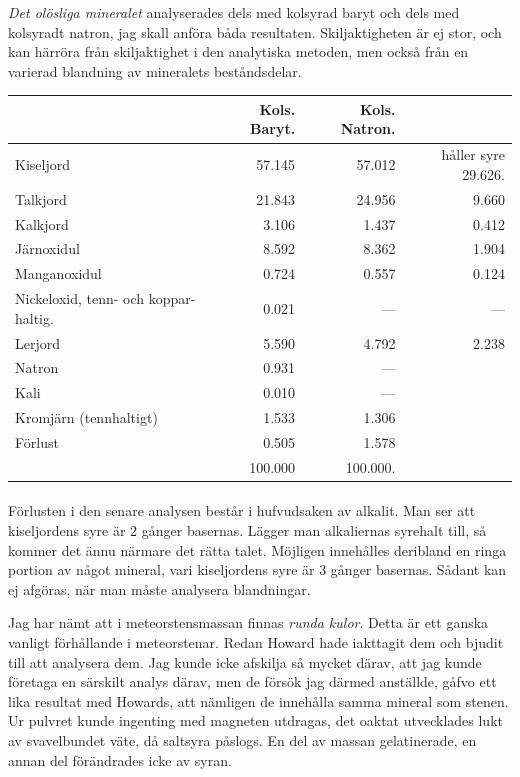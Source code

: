 \documentclass[a4paper, 12pt, oneside, swedish]{article}
\begin{document}
\emph{Det olösliga mineralet} analyserades dels med kolsyrad baryt och dels med kolsyradt natron, jag skall anföra båda resultaten. Skiljaktigheten är ej stor, och kan härröra från skiljaktighet i den analytiska metoden, men också från en varierad blandning av mineralets beståndsdelar.
\begin{table}[H]
    \centering\small
    \begin{tabular}{|l|r|r|r|}
    \hline
        ~ & Kols. Baryt. & Kols. Natron. & ~ \\ \hline
        Kiseljord & 57.145 & 57.012 & håller syre 29.626. \\ \hline
        Talkjord & 21.843 & 24.956 & 9.660 \\ \hline
        Kalkjord & 3.106 & 1.437 & 0.412 \\ \hline
        Järnoxidul & 8.592 & 8.362 & 1.904 \\ \hline
        Manganoxidul & 0.724 & 0.557 & 0.124 \\ \hline
        Nickeloxid, tenn- och koppar-haltig. & 0.021 & --- & --- \\ \hline
        Lerjord & 5.590 & 4.792 & 2.238 \\ \hline
        Natron & 0.931 & --- & ~ \\ \hline
        Kali & 0.010 & --- & ~ \\ \hline
        Kromjärn (tennhaltigt) & 1.533 & 1.306 & ~ \\ \hline
        Förlust & 0.505 & 1.578 & ~ \\ \hline
        ~ & 100.000 & 100.000. & ~ \\ \hline
    \end{tabular}
\end{table}
\paragraph{}
Förlusten i den senare analysen består i hufvudsaken av alkalit. Man ser att kiseljordens syre är 2 gånger basernas. Lägger man alkaliernas syrehalt till, så kommer det ännu närmare det rätta talet. Möjligen innehålles deribland en ringa portion av något mineral, vari kiseljordens syre är 3 gånger basernas. Sådant kan ej afgöras, när man måste analysera blandningar.

Jag har nämt att i meteorstensmassan finnas \emph{runda kulor}. Detta är ett ganska vanligt förhållande i meteorstenar. Redan Howard hade iakttagit dem och bjudit till att analysera dem. Jag kunde icke afskilja så mycket därav, att jag kunde företaga en särskilt analys därav, men de försök jag därmed anställde, gåfvo ett lika resultat med Howards, att nämligen de innehålla samma mineral som stenen. Ur pulvret kunde ingenting med magneten utdragas, det oaktat utvecklades lukt av svavelbundet väte, då saltsyra påslogs. En del av massan gelatinerade, en annan del förändrades icke av syran.
\end{document}
